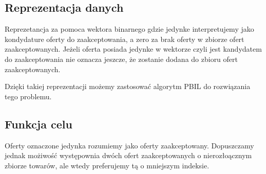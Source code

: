 \subsection{Reprezentacja danych}
Reprezetancja za pomoca wektora binarnego gdzie jedynke interpretujemy jako kondydature oferty do zaakceptowania, a zero za brak oferty w zbiorze ofert zaakceptowanych.
Jeżeli oferta posiada jedynke w wektorze czyli jest kandydatem do zaakceptowania nie oznacza jeszcze, że zostanie dodana do zbioru ofert zaakceptowanych.

Dzięki takiej reprezentacji możemy zastosować algorytm PBIL do rozwiązania tego problemu.

\subsection{Funkcja celu}
Oferty oznaczone jedynka rozumiemy jako oferty zaakceptowany. Dopuszczamy jednak możiwość występownia dwóch ofert zaakceptowanych o nierozłoącznym zbiorze towarów, ale wtedy preferujemy tą o mniejszym indeksie.
